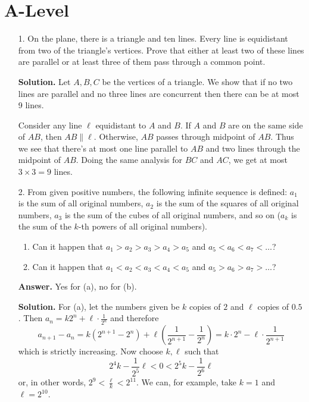 \documentclass[11pt,a4paper]{article}
\begin{document}
\section*{A-Level}
\begin{enumerate}
	\item[1.] On the plane, there is a triangle and ten lines. Every line is equidistant from two of the
	triangle’s vertices. Prove that either at least two of these lines are parallel or at least three
	of them pass through a common point.
	
	\textbf{Solution.}
	Let $A, B, C$ be the vertices of a triangle. We show that if no two lines are parallel and no three lines are concurrent then there can be at most 9 lines. 
	
	Consider any line $\ell$ equidistant to $A$ and $B$. 
	If $A$ and $B$ are on the same side of $AB$, then $AB\parallel \ell$. 
	Otherwise, $AB$ passes through midpoint of $AB$. 
	Thus we see that there's at most one line parallel to $AB$ and two lines through the midpoint of $AB$. 
	Doing the same analysis for $BC$ and $AC$, we get at most $3\times 3=9$ lines. 
	
	\item[2.] From given positive numbers, the following infinite sequence is defined: $a_1$ is the sum of all
	original numbers, $a_2$ is the sum of the squares of all original numbers, $a_3$ is the sum of the
	cubes of all original numbers, and so on ($a_k$ is the sum of the $k$-th powers of all original
	numbers).
	\begin{enumerate}
		\item Can it happen that $a_1 > a_2 > a_3 > a_4 > a_5$ and $a_5 < a_6 < a_7 < \ldots$?
		
		\item Can it happen that $a_1 < a_2 < a_3 < a_4 < a_5$ and $a_5 > a_6 > a_7 > \ldots$? 
	\end{enumerate}
    
    \textbf{Answer.} Yes for (a), no for (b). 
    
    \textbf{Solution.}
    For (a), 
    let the numbers given be $k$ copies of $2$ and $\ell$ copies of $0.5$. Then $a_n = k2^n+\ell\cdot \frac{1}{2^n}$ and therefore 
    \[
    a_{n+1}-a_n = k(2^{n+1}-2^n) + \ell(\frac{1}{2^{n+1}} - \frac{1}{2^{n}})
    =k\cdot 2^n - \ell\cdot \frac{1}{2^{n+1}}
    \]
    which is strictly increasing. 
    Now choose $k, \ell$ such that 
    \[
    2^4k-\frac{1}{2^5}\ell < 0 < 2^5k - \frac{1}{2^6}\ell
    \]
    or, in other words, $2^9<\frac{\ell}{k}<2^{11}$. We can, for example, take $k=1$ and $\ell=2^{10}$. 
    

\end{enumerate}
\end{document}
